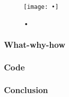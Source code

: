 \documentclass[Report.tex]{subfiles}
\begin{document}
\begin{figure}
\center
\texttt{[image: •]}
\caption{•}
\label{Fig:}
\end{figure}


\subsubsection{What-why-how}

\subsubsection{Code}


\subsubsection{Conclusion}
\end{document}
